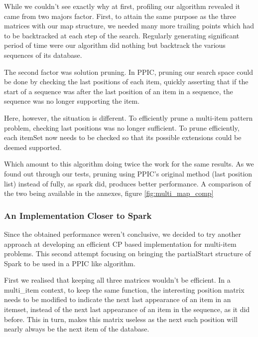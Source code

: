 \documentclass{eplmastersthesis}
\begin{document}
While we couldn't see exactly why at first, profiling our algorithm revealed it came from two majors factor. First, to attain the same purpose as the three matrices with our map structure, we needed many more trailing points which had to be backtracked at each step of the search. Regularly generating significant period of time were our algorithm did nothing but backtrack the various sequences of its database. \newline

The second factor was solution pruning. In PPIC, pruning our search space could be done by checking the last positions of each item, quickly asserting that if the start of a sequence was after the last position of an item in a sequence, the sequence was no longer supporting the item. \newline

Here, however, the situation is different. To efficiently prune a multi-item pattern problem, checking last positions was no longer sufficient. To prune efficiently, each itemSet now needs to be checked so that its possible extensions could be deemed supported. \newline

Which amount to this algorithm doing twice the work for the same results. As we found out through our tests, pruning using PPIC's original method (last position list) instead of fully, as spark did, produces better performance. A comparison of the two being available in the annexes, figure \ref{fig:multi_map_comp}

\subsubsection{An Implementation Closer to Spark}

Since the obtained performance weren't conclusive, we decided to try another approach at developing an efficient CP based implementation for multi-item problems. This second attempt focusing on bringing the partialStart structure of Spark to be used in a PPIC like algorithm. \newline

First we realised that keeping all three matrices wouldn't be efficient. In a multi\_item context, to keep the same function, the interesting position matrix needs to be modified to indicate the next last appearance of an item in an itemset, instead of the next last appearance of an item in the sequence, as it did before. This in turn, makes this matrix useless as the next such position will nearly always be the next item of the database. \newline
\end{document}
